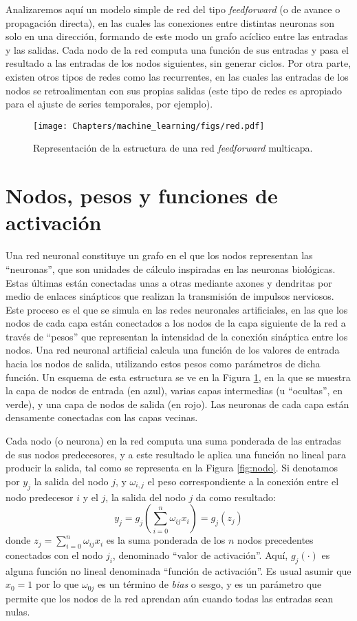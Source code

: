 Analizaremos aquí un modelo simple de red del tipo \textit{feedforward} (o de avance o propagación directa), en las cuales las conexiones entre distintas neuronas son solo en una dirección, formando de este modo un grafo acíclico entre las entradas y las salidas. Cada nodo de la red computa una función de sus entradas y pasa el resultado a las entradas de los nodos siguientes, sin generar ciclos. Por otra parte, existen otros tipos de redes como las recurrentes, en las cuales las entradas de los nodos se retroalimentan con sus propias salidas (este tipo de redes es apropiado para el ajuste de series temporales, por ejemplo).


\begin{figure}[t]
    \begin{center}
    \texttt{[image: Chapters/machine\_learning/figs/red.pdf]}
\end{center}
\caption{Representación de la estructura de una red \textit{feedforward} multicapa.}
\label{fig:red}
\end{figure}

\section{Nodos, pesos y funciones de activación}
Una red neuronal constituye un grafo en el que los nodos representan las ``neuronas'', que son unidades de cálculo inspiradas en las neuronas biológicas. Estas últimas están conectadas unas a otras mediante axones y dendritas por medio de enlaces sinápticos que realizan la transmisión de impulsos nerviosos. Este proceso es el que se simula en las redes neuronales artificiales, en las que los nodos de cada capa están conectados a los nodos de la capa siguiente de la red a través de ``pesos'' que representan la intensidad de la conexión sináptica entre los nodos. Una red neuronal artificial calcula una función de los valores de entrada hacia los nodos de salida, utilizando estos pesos como parámetros de dicha función. Un esquema de esta estructura se ve en la Figura \ref{fig:red}, en la que se muestra la capa de nodos de entrada (en azul), varias capas intermedias (u ``ocultas'', en verde), y una capa de nodos de salida (en rojo). Las neuronas de cada capa están densamente conectadas con las capas vecinas.

Cada nodo (o neurona) en la red computa una suma ponderada de las entradas de sus nodos predecesores, y a este resultado le aplica una función no lineal para producir la salida, tal como se representa en la Figura \ref{fig:nodo}. Si denotamos por $y_j$ la salida del nodo $j$, y $\omega_{i,j}$ el peso correspondiente a la conexión entre el nodo predecesor $i$ y el $j$, la salida del nodo $j$ da como resultado:
\[ y_j = g_j\left(\sum_{i=0}^n \omega_{ij} x_i\right) = g_j(z_j) \]
donde $z_j = \sum_{i=0}^n \omega_{ij} x_i$ es la suma ponderada de los $n$ nodos precedentes conectados con el nodo $j_i$, denominado ``valor de activación''. Aquí, $g_j(\cdot)$ es alguna función no lineal denominada ``función de activación''. Es usual asumir que $x_0 = 1$ por lo que $\omega_{0j}$ es un término de \textit{bias} o sesgo, y es un parámetro que permite que los nodos de la red aprendan aún cuando todas las entradas sean nulas.

